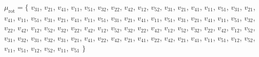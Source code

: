 \documentclass{amsart}
\theoremstyle{plain}
\theoremstyle{definition}
\theoremstyle{remark}
\newcommand{\murot}{{\mu_{\text{rot}}}}
\newlength\inlmutseqhang
\newcommand{\inlmutseq}[2]{%
  {\small%
    \settowidth\inlmutseqhang{$#1 = \big\{~$~}%
    \hangindent\inlmutseqhang%
    \noindent $#1 = \big\{$ #2 $\big\}$\par}%
}
\begin{document}
  \inlmutseq{\murot}{ $v_{3 1}$, $v_{2 1}$, $v_{4 1}$, $v_{1 1}$, $v_{5
      1}$, $v_{3 2}$, $v_{2 2}$, $v_{4 2}$, $v_{1 2}$, $v_{5 2}$, $v_{3
      1}$, $v_{2 1}$, $v_{4 1}$, $v_{1 1}$, $v_{5 1}$, $v_{3 1}$, $v_{2
      1}$, $v_{4 1}$, $v_{1 1}$, $v_{5 1}$, $v_{3 1}$, $v_{2 1}$, $v_{4
      1}$, $v_{1 1}$, $v_{5 1}$, $v_{3 1}$, $v_{2 1}$, $v_{4 1}$, $v_{1
      1}$, $v_{5 1}$, $v_{3 1}$, $v_{2 1}$, $v_{4 1}$, $v_{1 1}$, $v_{5
      1}$, $v_{3 2}$, $v_{2 2}$, $v_{4 2}$, $v_{1 2}$, $v_{5 2}$, $v_{3
      2}$, $v_{2 2}$, $v_{4 2}$, $v_{1 2}$, $v_{5 2}$, $v_{3 2}$, $v_{2
      2}$, $v_{4 2}$, $v_{1 2}$, $v_{5 2}$, $v_{3 2}$, $v_{2 2}$, $v_{4
      2}$, $v_{1 2}$, $v_{5 2}$, $v_{3 1}$, $v_{3 2}$, $v_{3 1}$, $v_{3
      2}$, $v_{3 1}$, $v_{2 1}$, $v_{4 1}$, $v_{2 2}$, $v_{4 2}$, $v_{2
      1}$, $v_{4 1}$, $v_{2 2}$, $v_{4 2}$, $v_{2 1}$, $v_{4 1}$, $v_{1
      1}$, $v_{5 1}$, $v_{1 2}$, $v_{5 2}$, $v_{1 1}$, $v_{5 1}$, $v_{1
      2}$, $v_{5 2}$, $v_{1 1}$, $v_{5 1}$ }
\end{document}
